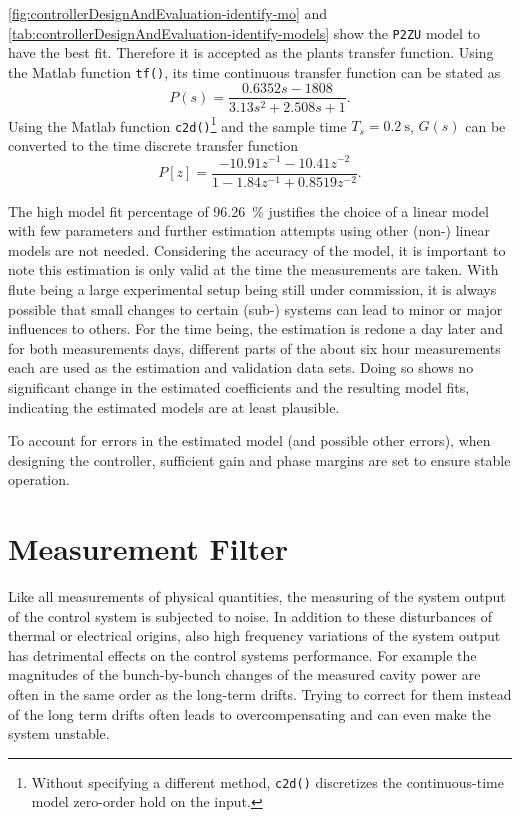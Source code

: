 \autoref{fig:controllerDesignAndEvaluation-identify-mo} and \autoref{tab:controllerDesignAndEvaluation-identify-models} show the \texttt{P2ZU} model to have the best fit. Therefore it is accepted as the plants transfer function. Using the Matlab function \texttt{tf()}, its time continuous transfer function can be stated as
\begin{equation}
P(s) = \frac{0.6352s - 1808}{3.13 s^2 + 2.508 s + 1}.
\end{equation}
Using the Matlab function \texttt{c2d()}\footnote{Without specifying a different method, \texttt{c2d()}  discretizes the continuous-time model zero-order hold on the input.} and the sample time $T_s=\SI{0.2}{\second}$, $G(s)$ can be converted to the time discrete transfer function
\begin{equation}
P[z] = \frac{-10.91 z^{-1} - 10.41 z^{-2}}{1 - 1.84 z^{-1} + 0.8519 z^{-2}}.
\end{equation}

The high model fit percentage of \SI{96.26}{\percent} justifies the choice of a linear model with few parameters and further estimation attempts using other (non-) linear models are not needed.
Considering the accuracy of the model, it is important to note this estimation is only valid at the time the measurements are taken. With \gls{flute} being a large experimental setup being still under commission, it is always possible that small changes to certain (sub-) systems can lead to minor or major influences to others.
For the time being, the estimation is redone a day later and for both measurements days, different parts of the about six hour measurements each are used as the estimation and validation data sets. Doing so shows no significant change in the estimated coefficients and the resulting model fits, indicating the estimated models are at least plausible.

To account for errors in the estimated model (and possible other errors), when designing the controller, sufficient gain and phase margins are set to ensure stable operation.










\newpage
\section{Measurement Filter}\label{sec:measurementFilter}
Like all measurements of physical quantities, the measuring of the system output of the control system is subjected to noise.
In addition to these disturbances of thermal or electrical origins, also high frequency variations of the system output has detrimental effects on the control systems performance.
For example the magnitudes of the bunch-by-bunch changes of the measured cavity power are often in the same order as the long-term drifts.
Trying to correct for them instead of the long term drifts often leads to overcompensating and can even make the system unstable.

